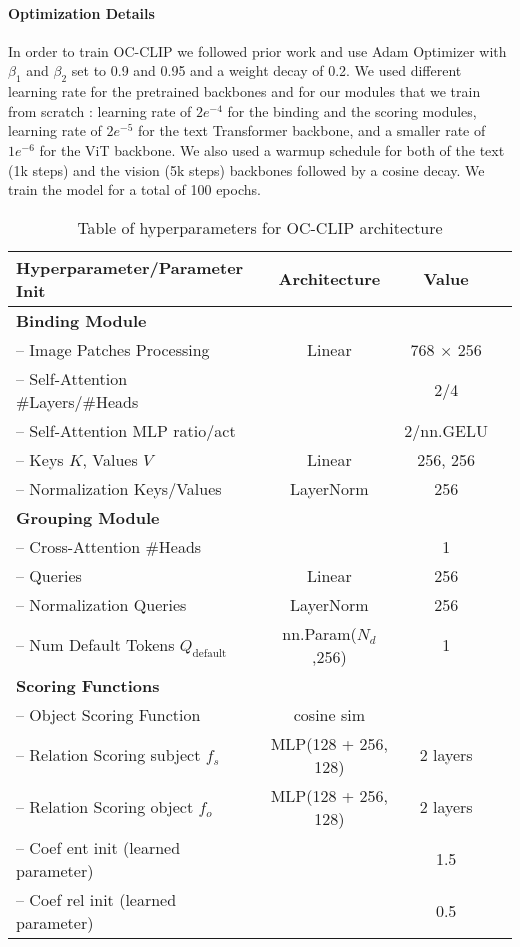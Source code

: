\paragraph{Optimization Details} In order to train OC-CLIP we followed prior work and use Adam Optimizer with $\beta_1$ and $\beta_2$ set to 0.9 and 0.95 and a weight decay of 0.2. We used different learning rate for the pretrained backbones and for our modules that we train from scratch : learning rate of $2e^{-4}$ for the binding and the scoring modules, learning rate of $2e^{-5}$ for the text Transformer backbone, and a smaller rate of $1e^{-6}$ for the ViT backbone. We also used a warmup schedule for both of the text (1k steps) and the vision (5k steps) backbones followed by a cosine decay. We train the model for a total of 100 epochs. 
\begin{table}[ht]
\centering
\begin{tabular}{@{}lccc@{}}
\toprule
Hyperparameter/Parameter Init & Architecture & Value\\ 
\midrule
\textbf{Binding Module} &  &  & \\
-- Image Patches Processing & Linear & 768 $\times$ 256 & \\
-- Self-Attention  \#Layers/\#Heads &  & 2/4 & \\
-- Self-Attention MLP ratio/act &  & 2/nn.GELU & \\
-- Keys $K$, Values $V$ & Linear & 256, 256 & \\
-- Normalization Keys/Values & LayerNorm & 256 & \\
\midrule
\textbf{Grouping Module} &  &  & \\
-- Cross-Attention \#Heads &  & 1 & \\
-- Queries & Linear & 256 \\
-- Normalization Queries & LayerNorm & 256 \\
-- Num Default Tokens $Q_{\text{default}}$ & nn.Param($N_d$,256) & 1\\
\midrule
\textbf{Scoring Functions} &  &  & \\

-- Object Scoring Function & cosine sim  &  & \\
-- Relation Scoring subject $ f_s$ &  MLP(128 + 256, 128) & 2 layers & \\
-- Relation Scoring object $ f_o$ &  MLP(128 + 256, 128) & 2 layers & \\
-- Coef ent init (learned parameter) & &1.5 \\
-- Coef rel init (learned parameter) & & 0.5\\

 \bottomrule
\end{tabular}%
\caption{Table of hyperparameters for OC-CLIP architecture}
\label{tab:hyperparam}
\end{table}

